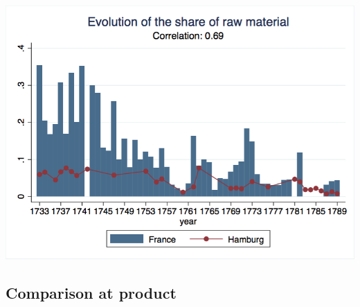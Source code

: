 \documentclass[12pt,a4paper,titlepage,english]{article}
\begin{document}
\includegraphics[scale=.28]{rawmat_share.png}

\subsection{Comparison at product}
\end{document}
